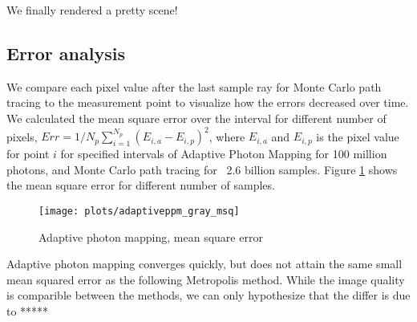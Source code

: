 We finally rendered a pretty scene!

\subsection*{Error analysis}
We compare each pixel value after the last sample ray for Monte Carlo path tracing to the measurement point to visualize how the errors decreased over time. We calculated the mean square error over the interval for different number of pixels, $Err = 1/N_p \sum_{i=1}^{N_p} (E_{i,a} - E_{i,p})^2$, where $E_{i,a}$ and $E_{i,p}$ is the pixel value for point $i$ for specified intervals of Adaptive Photon Mapping for 100 million photons, and Monte Carlo path tracing for ~2.6 billion samples. Figure \ref{fig:adaptive_msq} shows the mean square error for different number of samples.

\begin{figure}[H]
    \centering
    \texttt{[image: plots/adaptiveppm\_gray\_msq]}\\
    \caption{Adaptive photon mapping, mean square error}
    \label{fig:adaptive_msq}
\end{figure}

Adaptive photon mapping converges quickly, but does not attain the same small mean squared error as the following Metropolis method. While the image quality is comparible between the methods, we can only hypothesize that the differ is due to *****




